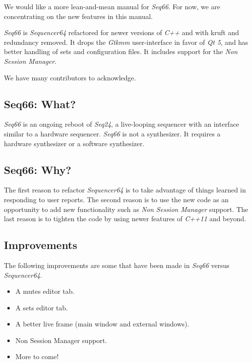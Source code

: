 \documentclass[
 11pt,
 twoside,
 a4paper,
 headinclude,
 footinclude,
 final                                 %
]{article}
\begin{document}
   We would like a more lean-and-mean manual for \textsl{Seq66}.
   For now, we are concentrating on the new features in this manual.

   \textsl{Seq66} is \textsl{Sequencer64} refactored for newer versions of
   \textsl{C++} and with kruft and redundancy removed.  It drops the
   \textsl{Gtkmm} user-interface in favor of \textsl{Qt 5},
   and has better handling of sets and configuration files.
   It includes support for the \textsl{Non Session Manager}.

   We have many contributors to acknowledge.

\subsection{Seq66: What?}
\label{subsec:what_is_sequencer66}

   \textsl{Seq66} is an ongoing reboot of \textsl{Seq24},
   a live-looping sequencer with an interface similar to a hardware sequencer.
   \textsl{Seq66} is not a synthesizer.  It requires a hardware
   synthesizer or a software synthesizer.


\subsection{Seq66: Why?}
\label{subsec:introduction_seq66_vs_others}

   The first reason to refactor \textsl{Sequencer64} is to take advantage of
   things learned in responding to user reports.  The second reason is to use
   the new code as an opportunity to add new functionality such as
   \textsl{Non Session Manager} support.  The last reason is to tighten the
   code by using newer features of \textsl{C++11} and beyond.

\subsection{Improvements}
\label{subsec:improvements}

   The following improvements are some that have been made in
   \textsl{Seq66} versus \textsl{Sequencer64}.

   \begin{itemize}
      \item A mutes editor tab.
      \item A sets editor tab.
      \item A better live frame (main window and external windows).
      \item Non Session Manager support.
      \item More to come!
   \end{itemize}
\end{document}
